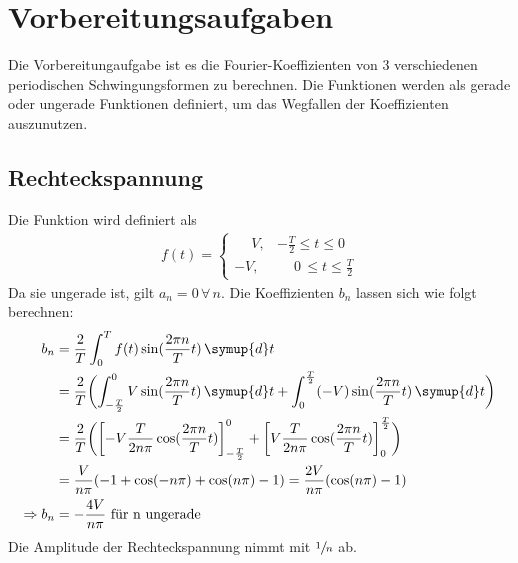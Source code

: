 \section{Vorbereitungsaufgaben}
Die Vorbereitungaufgabe ist es die Fourier-Koeffizienten von 3 verschiedenen periodischen Schwingungsformen zu berechnen.
Die Funktionen werden als gerade oder ungerade Funktionen definiert, um das Wegfallen der Koeffizienten auszunutzen.
\subsection{Rechteckspannung}
Die Funktion wird definiert als
\begin{align*}
    f(t) =
    \begin{cases}
        \phantom{-}V, & -\frac{T}{2}   \leq t  \leq 0 \\
        -V,           & \phantom{-}0 \,\leq t \leq \frac{T}{2}
    \end{cases}
\end{align*}
Da sie ungerade ist, gilt $a_n = 0  \, \forall \, n$.
Die Koeffizienten $b_n$ lassen sich wie folgt berechnen:
\begin{align*}
    b_n &= \frac{2}{T} \int_0^T f(t) \sin(\frac{2 \pi n}{T}t) \, \symup{d}t \\
        &= \frac{2}{T} \biggl( \int_{-\frac{T}{2}}^0 V \sin(\frac{2 \pi n}{T}t) \, \symup{d}t
                            + \int_{0}^{\frac{T}{2}} (-V) \sin(\frac{2 \pi n}{T}t) \, \symup{d}t \biggr) \\
        &= \frac{2}{T} \biggl( \left[-V \frac{T}{2n\pi} \cos(\frac{2 \pi n}{T}t) \right]_{-\frac{T}{2}}^0
                            + \left[V \frac{T}{2n\pi} \cos(\frac{2 \pi n}{T}t) \right]_{0}^{\frac{T}{2}} \biggr) \\
        &= \frac{V}{n\pi}(-1 + \cos(-n\pi)+ \cos(n\pi)-1) = \frac{2V}{n\pi} (\cos(n\pi)-1) \\
    \Rightarrow b_n &= - \frac{4V}{n\pi} \text{  für n ungerade}
\end{align*}
Die Amplitude der Rechteckspannung nimmt mit $\sfrac{1}{n}$ ab.
